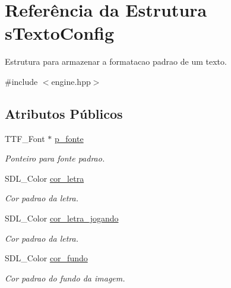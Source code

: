\hypertarget{structsTextoConfig}{
\section{Referência da Estrutura sTextoConfig}
\label{structsTextoConfig}
}


Estrutura para armazenar a formatacao padrao de um texto.  




{\ttfamily \#include $<$engine.hpp$>$}

\subsection*{Atributos Públicos}
\begin{DoxyCompactItemize}
\item 
\hypertarget{structsTextoConfig_aa4e7eda7d464d7773e470bedc2c29055}{
TTF\_\-Font $\ast$ \hyperlink{structsTextoConfig_aa4e7eda7d464d7773e470bedc2c29055}{p\_\-fonte}}
\label{structsTextoConfig_aa4e7eda7d464d7773e470bedc2c29055}

\begin{DoxyCompactList}\small\item\em Ponteiro para fonte padrao. \item\end{DoxyCompactList}\item 
\hypertarget{structsTextoConfig_a6ebb2a4f4e13f4a5c53ff3107c652835}{
SDL\_\-Color \hyperlink{structsTextoConfig_a6ebb2a4f4e13f4a5c53ff3107c652835}{cor\_\-letra}}
\label{structsTextoConfig_a6ebb2a4f4e13f4a5c53ff3107c652835}

\begin{DoxyCompactList}\small\item\em Cor padrao da letra. \item\end{DoxyCompactList}\item 
\hypertarget{structsTextoConfig_aca15e04b14f5579dcea27678f20111d7}{
SDL\_\-Color \hyperlink{structsTextoConfig_aca15e04b14f5579dcea27678f20111d7}{cor\_\-letra\_\-jogando}}
\label{structsTextoConfig_aca15e04b14f5579dcea27678f20111d7}

\begin{DoxyCompactList}\small\item\em Cor padrao da letra. \item\end{DoxyCompactList}\item 
\hypertarget{structsTextoConfig_ae1f03042ead2d1f2cd76c426754fbbba}{
SDL\_\-Color \hyperlink{structsTextoConfig_ae1f03042ead2d1f2cd76c426754fbbba}{cor\_\-fundo}}
\label{structsTextoConfig_ae1f03042ead2d1f2cd76c426754fbbba}

\begin{DoxyCompactList}\small\item\em Cor padrao do fundo da imagem. \item\end{DoxyCompactList}\end{DoxyCompactItemize}


